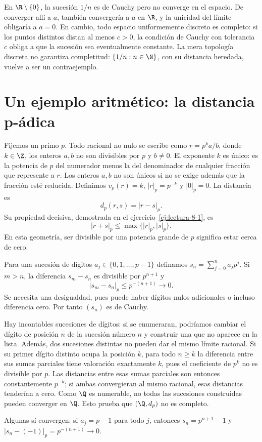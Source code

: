 \begin{ejemplo}
En $\R\setminus\{0\}$, la sucesión $1/n$ es de Cauchy pero no converge en el espacio. De converger allí a $a$, también convergería a $a$ en $\R$, y la unicidad del límite obligaría a $a=0$. En cambio, todo espacio uniformemente discreto es completo: si los puntos distintos distan al menos $c>0$, la condición de Cauchy con tolerancia $c$ obliga a que la sucesión sea eventualmente constante. La mera topología discreta no garantiza completitud: $\{1/n:n\in\N\}$, con su distancia heredada, vuelve a ser un contraejemplo.
\end{ejemplo}

\section{Un ejemplo aritmético: la distancia p-ádica}
Fijemos un primo $p$. Todo racional no nulo se escribe como $r=p^k a/b$, donde $k\in\Z$, los enteros $a,b$ no son divisibles por $p$ y $b\ne0$. El exponente $k$ es único: es la potencia de $p$ del numerador menos la del denominador de cualquier fracción que represente a $r$. Los enteros $a,b$ no son únicos si no se exige además que la fracción esté reducida. Definimos $v_p(r)=k$, $|r|_p=p^{-k}$ y $|0|_p=0$. La distancia es
\[
 d_p(r,s)=|r-s|_p.
\]
Su propiedad decisiva, demostrada en el ejercicio~\ref{ej:lectura-8-1}, es
\[
 |r+s|_p\leq\max\{|r|_p,|s|_p\}.
\]
En esta geometría, ser divisible por una potencia grande de $p$ significa estar cerca de cero.

\begin{ejemplo}\label{ch08:padica-incompleta}
Para una sucesión de dígitos $a_j\in\{0,1,\ldots,p-1\}$ definamos $s_n=\sum_{j=0}^n a_jp^j$. Si $m>n$, la diferencia $s_m-s_n$ es divisible por $p^{n+1}$ y
\[
 |s_m-s_n|_p\leq p^{-(n+1)}\longrightarrow0.
\]
Se necesita una desigualdad, pues puede haber dígitos nulos adicionales o incluso diferencia cero. Por tanto $(s_n)$ es de Cauchy.

Hay incontables sucesiones de dígitos: si se enumeraran, podríamos cambiar el dígito de posición $n$ de la sucesión número $n$ y construir una que no aparece en la lista. Además, dos sucesiones distintas no pueden dar el mismo límite racional. Si su primer dígito distinto ocupa la posición $k$, para todo $n\geq k$ la diferencia entre sus sumas parciales tiene valoración exactamente $k$, pues el coeficiente de $p^k$ no es divisible por $p$. Las distancias entre esas sumas parciales son entonces constantemente $p^{-k}$; si ambas convergieran al mismo racional, esas distancias tenderían a cero. Como $\Q$ es numerable, no todas las sucesiones construidas pueden converger en $\Q$. Esto prueba que $(\Q,d_p)$ no es completo.

Algunas sí convergen: si $a_j=p-1$ para todo $j$, entonces $s_n=p^{n+1}-1$ y $|s_n-(-1)|_p=p^{-(n+1)}\to0$.
\end{ejemplo}

